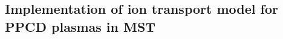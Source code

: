 \begin{refsection}
\chapter{Implementation of ion transport model for PPCD plasmas in MST}\label{ch:implementation}






\printbibliography
\end{refsection}